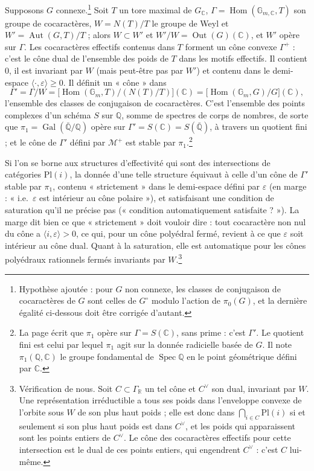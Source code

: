 \documentclass[11pt,a4paper]{article}
\begin{document}
Supposons $G$ connexe.\footnote{Hypothèse ajoutée : pour $G$ non connexe, les
classes de conjugaison de cocaractères de $G$ sont celles de $G^{\circ}$ modulo
l'action de $\pi_{0}(G)$, et la dernière égalité ci-dessous doit être
corrigée d'autant.} Soit $T$ un tore maximal de $G_{\mathbb{C}}$, $\Gamma =
\operatorname{Hom}(\mathbb{G}_{m,\mathbb{C}}, T)$ son groupe de cocaractères,
$W = N(T)/T$ le groupe de Weyl et $W' = \operatorname{Aut}(G, T)/T$ ; alors $W
\subset W'$ et $W'/W = \operatorname{Out}(G)(\mathbb{C})$, et $W'$ opère sur
$\Gamma$. Les cocaractères effectifs contenus dans $T$ forment un cône convexe
$\Gamma^{+}$ : c'est le cône dual de l'ensemble des poids de $T$ dans les
motifs effectifs. Il contient $0$, il est invariant par $W$ (mais peut-être
pas par $W'$) et contenu dans le demi-espace $\langle \cdot,
\varepsilon\rangle \geqslant 0$. Il définit un « cône » dans
\[
\Gamma' = \Gamma/W
= \bigl[\operatorname{Hom}(\mathbb{G}_{m}, T)/(N(T)/T)\bigr](\mathbb{C})
= \bigl[\operatorname{Hom}(\mathbb{G}_{m}, G)/G\bigr](\mathbb{C}) ,
\]
l'ensemble des classes de conjugaison de cocaractères. C'est l'ensemble des
points complexes d'un schéma $S$ sur $\mathbb{Q}$, somme de spectres de corps
de nombres, de sorte que $\pi_{1} = \operatorname{Gal}(\bar{\mathbb{Q}}/
\mathbb{Q})$ opère sur $\Gamma' = S(\mathbb{C}) = S(\bar{\mathbb{Q}})$, à
travers un quotient fini ; et le cône de $\Gamma'$ défini par $\mathcal{M}^{+}$
est stable par $\pi_{1}$.\footnote{La page écrit que $\pi_{1}$ opère sur
$\Gamma = S(\mathbb{C})$, sans prime : c'est $\Gamma'$. Le quotient fini est
celui par lequel $\pi_{1}$ agit sur la donnée radicielle basée de $G$. Il note
$\pi_{1}(\mathbb{Q}, \mathbb{C})$ le groupe fondamental de
$\operatorname{Spec}\mathbb{Q}$ en le point géométrique défini par
$\mathbb{C}$.}

Si l'on se borne aux structures d'effectivité qui sont des intersections de
catégories $\mathrm{Pl}(i)$, la donnée d'une telle structure équivaut à celle
d'un cône de $\Gamma'$ stable par $\pi_{1}$, contenu « strictement » dans le
demi-espace défini par $\varepsilon$ (en marge : « i.e.\ $\varepsilon$ est
intérieur au cône polaire »), et satisfaisant une condition de saturation
qu'il ne précise pas (« condition automatiquement satisfaite ? »). La marge dit
bien ce que « strictement » doit vouloir dire : tout cocaractère non nul du
cône a $\langle i, \varepsilon\rangle > 0$, ce qui, pour un cône polyédral
fermé, revient à ce que $\varepsilon$ soit intérieur au cône dual. Quant à la
saturation, elle est automatique pour les cônes polyédraux rationnels fermés
invariants par $W$.\footnote{Vérification de nous. Soit $C \subset
\Gamma_{\mathbb{R}}$ un tel cône et $C^{\vee}$ son dual, invariant par $W$. Une
représentation irréductible a tous ses poids dans l'enveloppe convexe de
l'orbite sous $W$ de son plus haut poids ; elle est donc dans $\bigcap_{i \in
C}\mathrm{Pl}(i)$ si et seulement si son plus haut poids est dans $C^{\vee}$,
et les poids qui apparaissent sont les points entiers de
$C^{\vee}$. Le cône des cocaractères effectifs pour cette intersection est le
dual de ces points entiers, qui engendrent $C^{\vee}$ : c'est $C$ lui-même.}
\end{document}
